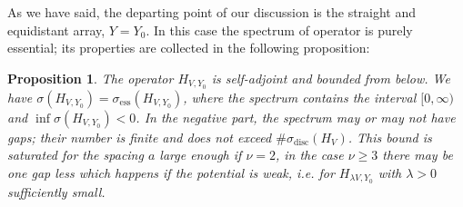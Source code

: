 \documentclass{article}
\numberwithin{equation}{section}
\newtheorem{proposition}[theorem]{Proposition}
\theoremstyle{definition}
\begin{document}
As we have said, the departing point of our discussion is the straight and equidistant array, $Y=Y_0$. In this case the spectrum of operator is purely essential; its properties are collected in the following proposition:
 \begin{proposition} \label{prop:straightline}
The operator $H_{V,Y_0}$ is self-adjoint and bounded from below. We have $\sigma(H_{V,Y_0})= \sigma_\mathrm{ess}(H_{V,Y_0})$, where the spectrum contains the interval $[0,\infty)$ and $\inf\sigma(H_{V,Y_0})<0$. In the negative part, the spectrum may or may not have gaps; their number is finite and does not exceed $\#\sigma_\mathrm{disc}(H_{V})$. This bound is saturated for the spacing $a$ large enough if $\nu=2$, in the case $\nu\ge 3$ there may be one gap less which happens if the potential is weak, i.e. for $H_{\lambda V,Y_0}$ with $\lambda>0$ sufficiently small.
 \end{proposition}
\end{document}

